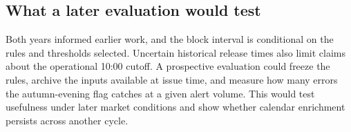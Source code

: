 \subsection{What a later evaluation would test}
Both years informed earlier work, and the block interval is
conditional on the rules and thresholds selected. Uncertain
historical release times also limit claims about the operational
10:00 cutoff. A prospective evaluation could freeze the rules,
archive the inputs available at issue time, and measure how many
errors the autumn-evening flag catches at a given alert volume.
This would test usefulness under later market conditions and
show whether calendar enrichment persists across another cycle.
